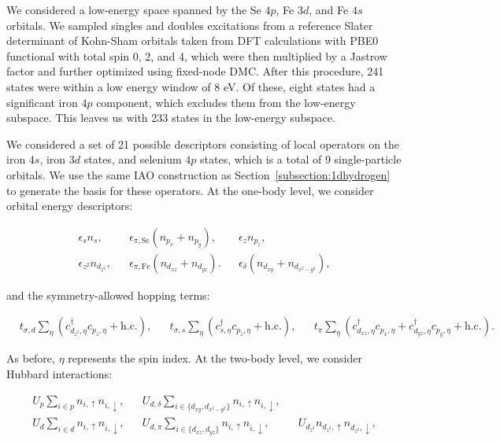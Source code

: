 We considered a low-energy space spanned by the Se $4p$, Fe $3d$, and Fe $4s$ orbitals. We sampled singles and doubles excitations from a reference Slater determinant 
of Kohn-Sham orbitals taken from DFT calculations with PBE0 functional with total spin 0, 2, and 4, which were then multiplied by a Jastrow factor and further optimized using fixed-node DMC. 
After this procedure, 241 states were within a low energy window of 8 eV. 
Of these, eight states had a significant iron $4p$ component, which excludes them from the low-energy subspace. 
This leaves us with 233 states in the low-energy subspace.

We considered a set of 21 possible descriptors consisting of local operators on the iron $4s$, iron $3d$ states, and selenium $4p$ states, which is a total of 9 single-particle orbitals.
We use the same IAO construction as Section~\ref{subsection:1dhydrogen} to generate the basis for these operators.
At the one-body level, we consider orbital energy descriptors: 

\begin{align}
  &\epsilon_{s} n_s,&
  &\epsilon_{\pi,\mathrm{Se}} (n_{p_x} + n_{p_y}), &
  &\epsilon_{z} n_{p_z},&
  \nonumber \\
  &\epsilon_{z^2} n_{d_{z^2}},& 
  &\epsilon_{\pi,\mathrm{Fe}} (n_{d_{xz}} + n_{d_{yz}}).& 
  &\epsilon_{\delta} (n_{d_{xy}} + n_{d_{x^2-y^2}}),&
\end{align}

and the symmetry-allowed hopping terms:

\begin{align}
  &t_{\sigma,d} \sum_{\eta} \left( c_{d_{z^2},\eta}^{\dagger} c_{p_z,\eta} + \text{h.c.} \right),&
  &t_{\sigma,s} \sum_{\eta} \left(c_{s,\eta}^{\dagger}  c_{p_z,\eta} + \text{h.c.} \right),&
  &t_{\pi} \sum_{\eta} \left(c_{d_{xz},\eta}^{\dagger}  c_{p_x,\eta} + c_{d_{yz},\eta}^{\dagger}  c_{p_y,\eta} + \text{h.c.} \right).&
\end{align}

As before, $\eta$ represents the spin index. At the two-body level, we consider Hubbard interactions:

\begin{align}
  &U_p \sum_{i \in p} n_{i,\uparrow} n_{i,\downarrow},&
  &U_{d,\delta} \sum_{i\in \{d_{xy},d_{x^2-y^2}\}} n_{i,\uparrow} n_{i,\downarrow},&
  \nonumber \\
  &U_d \sum_{i \in d} n_{i,\uparrow} n_{i,\downarrow},&
  &U_{d,\pi} \sum_{i\in \{d_{xz},d_{yz}\}} n_{i,\uparrow} n_{i,\downarrow},&
  &U_{d_{z^2}} n_{d_{z^2},\uparrow} n_{d_{z^2},\downarrow},&
\end{align}

